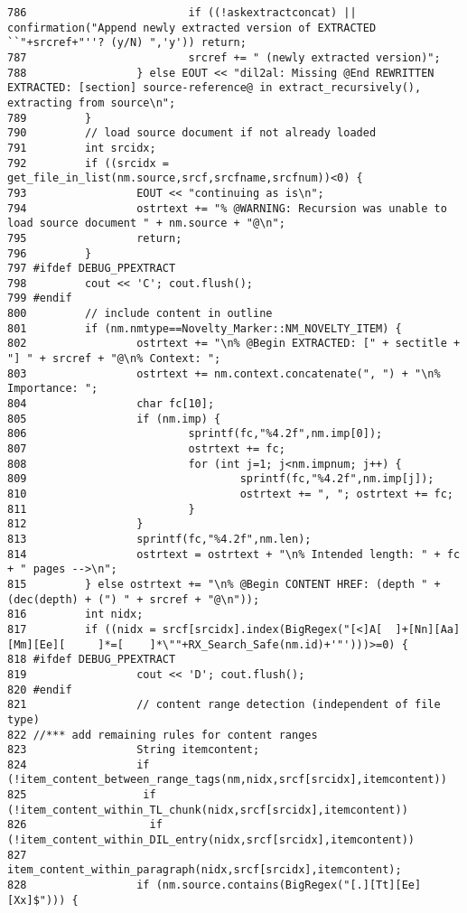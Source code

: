 \begin{verbatim}
786                         if ((!askextractconcat) || confirmation("Append newly extracted version of EXTRACTED ``"+srcref+"''? (y/N) ",'y')) return;
787                         srcref += " (newly extracted version)";
788                 } else EOUT << "dil2al: Missing @End REWRITTEN EXTRACTED: [section] source-reference@ in extract_recursively(), extracting from source\n";
789         }
790         // load source document if not already loaded
791         int srcidx;
792         if ((srcidx = get_file_in_list(nm.source,srcf,srcfname,srcfnum))<0) {
793                 EOUT << "continuing as is\n";
794                 ostrtext += "% @WARNING: Recursion was unable to load source document " + nm.source + "@\n";
795                 return;
796         }
797 #ifdef DEBUG_PPEXTRACT
798         cout << 'C'; cout.flush();
799 #endif
800         // include content in outline
801         if (nm.nmtype==Novelty_Marker::NM_NOVELTY_ITEM) {
802                 ostrtext += "\n% @Begin EXTRACTED: [" + sectitle + "] " + srcref + "@\n% Context: ";
803                 ostrtext += nm.context.concatenate(", ") + "\n% Importance: ";
804                 char fc[10];
805                 if (nm.imp) {
806                         sprintf(fc,"%4.2f",nm.imp[0]);
807                         ostrtext += fc;
808                         for (int j=1; j<nm.impnum; j++) {
809                                 sprintf(fc,"%4.2f",nm.imp[j]);
810                                 ostrtext += ", "; ostrtext += fc;
811                         }
812                 }
813                 sprintf(fc,"%4.2f",nm.len);
814                 ostrtext = ostrtext + "\n% Intended length: " + fc + " pages -->\n";
815         } else ostrtext += "\n% @Begin CONTENT HREF: (depth " + (dec(depth) + (") " + srcref + "@\n"));
816         int nidx;
817         if ((nidx = srcf[srcidx].index(BigRegex("[<]A[  ]+[Nn][Aa][Mm][Ee][     ]*=[    ]*\""+RX_Search_Safe(nm.id)+'"')))>=0) {
818 #ifdef DEBUG_PPEXTRACT
819                 cout << 'D'; cout.flush();
820 #endif
821                 // content range detection (independent of file type)
822 //*** add remaining rules for content ranges
823                 String itemcontent;
824                 if (!item_content_between_range_tags(nm,nidx,srcf[srcidx],itemcontent))
825                  if (!item_content_within_TL_chunk(nidx,srcf[srcidx],itemcontent))
826                   if (!item_content_within_DIL_entry(nidx,srcf[srcidx],itemcontent))
827                    item_content_within_paragraph(nidx,srcf[srcidx],itemcontent);
828                 if (nm.source.contains(BigRegex("[.][Tt][Ee][Xx]$"))) {

\end{verbatim}

